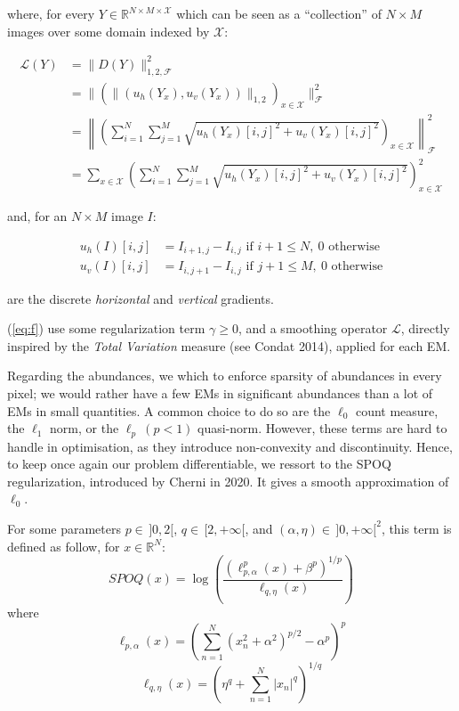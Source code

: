 \documentclass[conference]{IEEEtran}
\begin{document}
where, for every $Y \in \mathbb{R}^{N \times M \times \mathcal{X}}$ which can be seen as a ``collection'' of $N \times M$ images over some domain indexed by $\mathcal{X}$:

\begin{align}\label{eq:smoothing}
  \mathcal{L}(Y) &= \| D(Y) \|_{1,2,\mathcal{F}}^2\\
  &= \| \left( \| (u_h (Y_x), u_v (Y_x)) \|_{1,2} \right)_{x \in \mathcal{X}} \|_{\mathcal{F}}^2\\
  &= \left\| \left(\sum_{i=1}^N \sum_{j=1}^M \sqrt{ u_h (Y_{x})[i, j]^2 + u_v (Y_x)[i, j]^2 } \right)_{x \in \mathcal{X}} \right\|_{\mathcal{F}}^2\\
  &= \sum_{x \in \mathcal{X}} \left( \sum_{i=1}^N \sum_{j=1}^M \sqrt{ u_h (Y_{x})[i, j]^2 + u_v (Y_x)[i, j]^2 } \right)_{x \in \mathcal{X}}^2
\end{align}

and, for an $N \times M$ image $I$:

\begin{align}\label{eq:discrete-grad}
  u_h (I) [i, j] &= I_{i+1, j} - I_{i, j} \text{ if }i + 1 \leq N,\ 0 \text{ otherwise}\\
  u_v (I) [i, j] &= I_{i, j+1} - I_{i, j} \text{ if }j + 1 \leq M,\ 0 \text{ otherwise}
\end{align}

are the discrete \emph{horizontal} and \emph{vertical} gradients.

(\ref{eq:f}) use some regularization term $\gamma \geq 0$, and a smoothing operator $\mathcal{L}$, directly inspired by the \emph{Total Variation} measure (see Condat 2014), applied for each EM.

Regarding the abundances, we which to enforce sparsity of abundances in every pixel; we would rather have a few EMs in significant abundances than a lot of EMs in small quantities. A common choice to do so are the $\ell_0$ count measure, the $\ell_1$ norm, or the $\ell_p \ (p<1)$ quasi-norm. However, these terms are hard to handle in optimisation, as they introduce non-convexity and discontinuity. Hence, to keep once again our problem differentiable, we ressort to the SPOQ regularization, introduced by Cherni in 2020. It gives a smooth approximation of $\ell_0$.

For some parameters $p\in \, ]0, 2[$, $q\in \, [2, +\infty[$, and $(\alpha, \eta) \in \, ]0, +\infty [^2$, this term is defined as follow, for $x \in \mathbb{R}^N$:
$$SPOQ(x) = \log \left( \frac{(\ell_{p,\alpha}^p (x) + \beta^p)^{1/p}}{\ell_{q,\eta} (x)} \right)$$
        where
        $$\ell_{p,\alpha} (x) = \left( \sum_{n=1}^N (x_n^2 + \alpha^2)^{p/2} - \alpha^p \right)^p$$
        $$\ell_{q,\eta} (x) = \left( \eta^q + \sum_{n=1}^N |x_n|^q \right)^{1/q}$$
\end{document}
